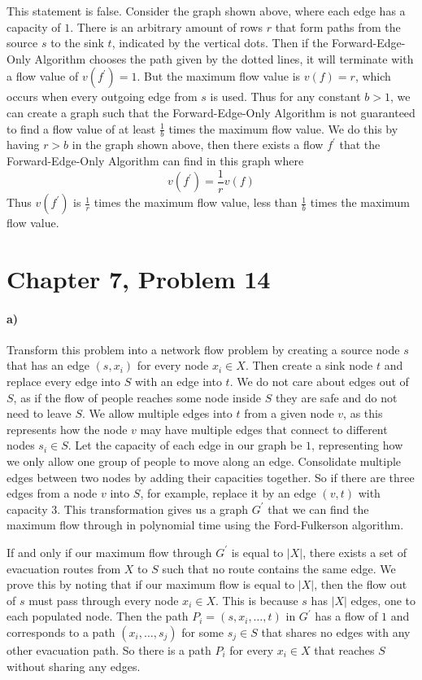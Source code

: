 \documentclass[12pt]{article}
\begin{document}
This statement is false. Consider the graph shown above, where each edge has a capacity of \(1\). There is an arbitrary amount
of rows \(r\) that form paths from the source \(s\) to the sink \(t\), indicated by the vertical dots. Then if the Forward-Edge-Only Algorithm
chooses the path given by the dotted lines, it will terminate with a flow value of \(v(f^\prime)=1\). But
the maximum flow value is \(v(f)=r\), which occurs when every outgoing edge from \(s\) is used. Thus for any constant \(b>1\), we can
create a graph such that the Forward-Edge-Only Algorithm is not guaranteed to find a flow value of at least \(\frac{1}{b}\) times the maximum flow value.
We do this by having \(r>b\) in the graph shown above, then there exists a flow \(f^\prime\) that the Forward-Edge-Only Algorithm can find in this graph where
\[v(f^\prime)=\frac{1}{r}v(f)\]
Thus \(v(f^\prime)\) is \(\frac{1}{r}\) times the maximum flow value, less than \(\frac{1}{b}\) times the maximum flow value.

\pagebreak

\section*{Chapter 7, Problem 14}

\paragraph{a)}

Transform this problem into a network flow problem by creating a source node \(s\) that has an edge \((s,x_i)\) for every node \(x_i\in X\). Then
create a sink node \(t\) and replace every edge into \(S\) with an edge into \(t\). We do not care about edges out of \(S\), as if the flow of people
reaches some node inside \(S\) they are safe and do not need to leave \(S\). We allow multiple edges into \(t\) from a given node \(v\), as this represents
how the node \(v\) may have multiple edges that connect to different nodes \(s_i\in S\). Let the capacity of each edge in our graph be \(1\), representing how
we only allow one group of people to move along an edge. Consolidate multiple edges between two nodes by adding their capacities together. So if there
are three edges from a node \(v\) into \(S\), for example, replace it by an edge \((v,t)\) with capacity \(3\). This transformation gives us a graph
\(G^\prime\) that we can find the maximum flow through in polynomial time using the Ford-Fulkerson algorithm.

If and only if our maximum flow through \(G^\prime\) is equal to \(|X|\), there exists a set of evacuation routes from \(X\) to \(S\) such that no route contains the same edge.
We prove this by noting that if our maximum flow is equal to \(|X|\), then the flow out of \(s\) must pass through every node \(x_i\in X\). This is because
\(s\) has \(|X|\) edges, one to each populated node. Then the path \(P_i=(s,x_i,\ldots,t)\) in \(G^\prime\) has a flow of \(1\) and corresponds to a
path \((x_i,\ldots,s_j)\) for some \(s_j\in S\) that shares no edges with any other evacuation path. So there is a path \(P_i\) for every \(x_i\in X\) that
reaches \(S\) without sharing any edges.
\end{document}
